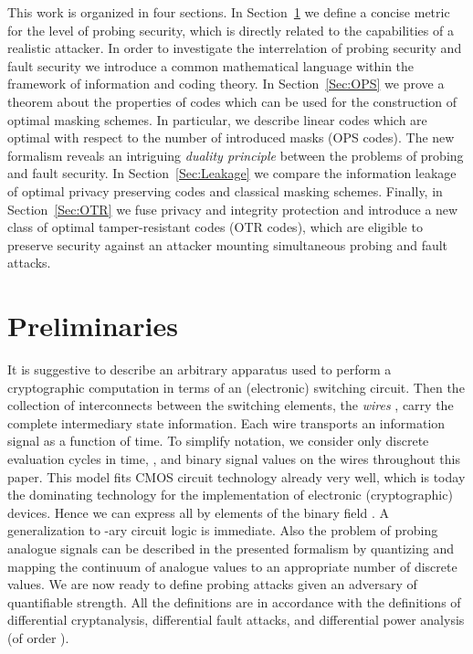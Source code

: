 \documentclass[11pt]{llncs}
\begin{document}
This work is organized in four sections.
In Section~\ref{Sec:Preliminaries} we define a concise metric
for the level of probing security,
which is directly related to the capabilities of a realistic attacker.
In order to investigate the interrelation of probing security
and fault security we introduce a common mathematical language
within the framework of information and coding theory.
In Section~\ref{Sec:OPS} we prove a theorem about the
properties of codes which can be used for the construction
of optimal masking schemes.
In particular, we describe linear codes which
are optimal with respect to the number of introduced masks (OPS codes).
The new formalism reveals an intriguing \emph{duality principle}
between the problems of probing and fault security.
In Section~\ref{Sec:Leakage} we compare the
information leakage of optimal privacy preserving codes and
classical masking schemes.
Finally, in Section~\ref{Sec:OTR} we fuse privacy and integrity protection
and introduce a new class of
optimal tamper-resistant codes (OTR codes),
which are eligible to preserve security against an attacker mounting
simultaneous probing and fault attacks.


\section{Preliminaries}  \label{Sec:Preliminaries}
It is suggestive to describe an arbitrary apparatus used to
perform a cryptographic computation in terms of an (electronic) switching circuit.
Then the collection of interconnects between the switching elements,
the \emph{wires} ,
carry the complete intermediary state information.
Each wire  transports an information signal 
as a function of time.
To simplify notation, we consider only
discrete evaluation cycles in time, ,
and binary signal values on the wires throughout this paper.
This model fits CMOS circuit technology already very well,
which is today the dominating technology for
the implementation of electronic (cryptographic) devices.
Hence we can express all  by elements of the binary field .
A generalization to -ary circuit logic is immediate.
Also the problem of probing analogue signals can be described in
the presented formalism by quantizing and mapping the continuum
of analogue values to an appropriate number of discrete values.
We are now ready to define probing attacks
given an adversary of quantifiable strength. All the definitions are in
accordance with the definitions of differential cryptanalysis,
differential fault attacks, and differential power analysis (of order ).
\end{document}
